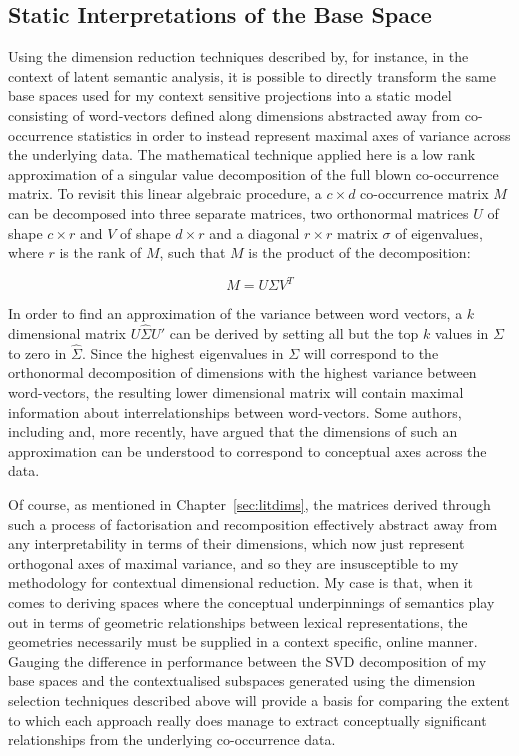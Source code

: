 \subsection{Static Interpretations of the Base Space}
Using the dimension reduction techniques described by, for instance, \cite{DeerwesterEA1990} in the context of latent semantic analysis, it is possible to directly transform the same base spaces used for my context sensitive projections into a static model consisting of word-vectors defined along dimensions abstracted away from co-occurrence statistics in order to instead represent maximal axes of variance across the underlying data.  The mathematical technique applied here is a low rank approximation of a singular value decomposition of the full blown co-occurrence matrix.  To revisit this linear algebraic procedure, a $c \times d$ co-occurrence matrix $M$ can be decomposed into three separate matrices, two orthonormal matrices $U$ of shape $c \times r$ and $V$ of shape $d \times r$ and a diagonal $r \times r$ matrix $\sigma$ of eigenvalues, where $r$ is the rank of $M$, such that $M$ is the product of the decomposition:

\begin{equation}
M = U \Sigma V^{T}
\end{equation}

\noindent In order to find an approximation of the variance between word vectors, a $k$ dimensional matrix $U\hat{\Sigma}U'$ can be derived by setting all but the top $k$ values in $\Sigma$ to zero in $\hat{\Sigma}$.  Since the highest eigenvalues in $\Sigma$ will correspond to the orthonormal decomposition of dimensions with the highest variance between word-vectors, the resulting lower dimensional matrix will contain maximal information about interrelationships between word-vectors.  Some authors, including \citeauthor{DeerwesterEA1990} and, more recently, \cite{TurneyEA2010} have argued that the dimensions of such an approximation can be understood to correspond to conceptual axes across the data.

Of course, as mentioned in Chapter~\ref{sec:litdims}, the matrices derived through such a process of factorisation and recomposition effectively abstract away from any interpretability in terms of their dimensions, which now just represent orthogonal axes of maximal variance, and so they are insusceptible to my methodology for contextual dimensional reduction.  My case is that, when it comes to deriving spaces where the conceptual underpinnings of semantics play out in terms of geometric relationships between lexical representations, the geometries necessarily must be supplied in a context specific, online manner.  Gauging the difference in performance between the SVD decomposition of my base spaces and the contextualised subspaces generated using the dimension selection techniques described above will provide a basis for comparing the extent to which each approach really does manage to extract conceptually significant relationships from the underlying co-occurrence data.

